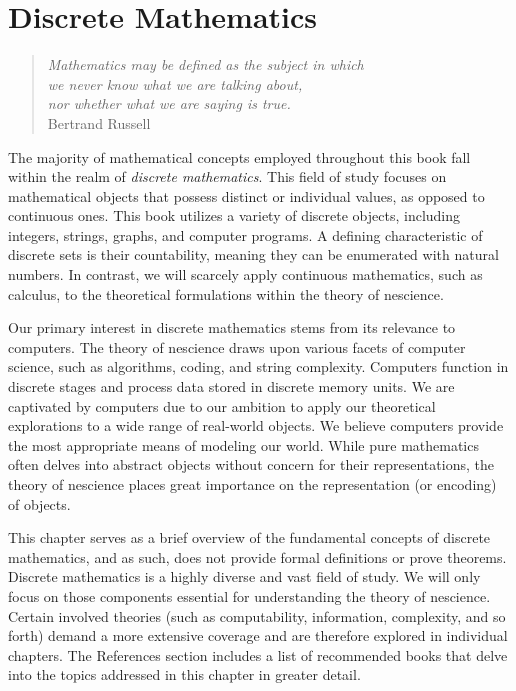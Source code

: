 %
%


\chapter{Discrete Mathematics}
\label{chap:Discrete_Mathematics}

\begin{quote}
\begin{flushright}
\emph{Mathematics may be defined as the subject in which\\
we never know what we are talking about,\\
nor whether what we are saying is true.}\\
Bertrand Russell
\end{flushright}
\end{quote}
\bigskip

The majority of mathematical concepts employed throughout this book fall within the realm of \emph{discrete mathematics}. This field of study focuses on mathematical objects that possess distinct or individual values, as opposed to continuous ones. This book utilizes a variety of discrete objects, including integers, strings, graphs, and computer programs. A defining characteristic of discrete sets is their countability, meaning they can be enumerated with natural numbers. In contrast, we will scarcely apply continuous mathematics, such as calculus, to the theoretical formulations within the theory of nescience.

Our primary interest in discrete mathematics stems from its relevance to computers. The theory of nescience draws upon various facets of computer science, such as algorithms, coding, and string complexity. Computers function in discrete stages and process data stored in discrete memory units. We are captivated by computers due to our ambition to apply our theoretical explorations to a wide range of real-world objects. We believe computers provide the most appropriate means of modeling our world. While pure mathematics often delves into abstract objects without concern for their representations, the theory of nescience places great importance on the representation (or encoding) of objects.

This chapter serves as a brief overview of the fundamental concepts of discrete mathematics, and as such, does not provide formal definitions or prove theorems. Discrete mathematics is a highly diverse and vast field of study. We will only focus on those components essential for understanding the theory of nescience. Certain involved theories (such as computability, information, complexity, and so forth) demand a more extensive coverage and are therefore explored in individual chapters. The References section includes a list of recommended books that delve into the topics addressed in this chapter in greater detail.

